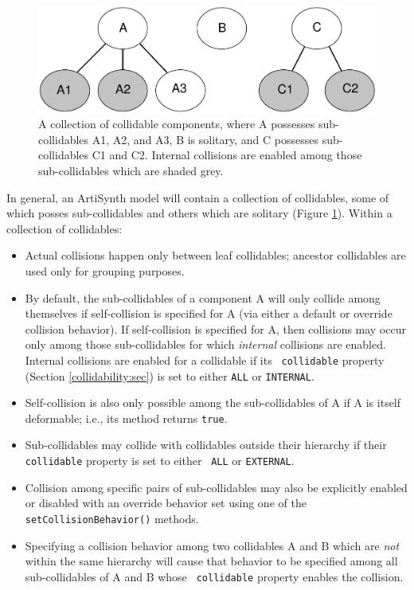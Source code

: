 \begin{figure}[ht]
\begin{center}
 \includegraphics[width=5in]{images/CollidableGroups}
\end{center}
\caption{A collection of collidable components, where A possesses
sub-collidables A1, A2, and A3, B is solitary, and C possesses
sub-collidables C1 and C2. Internal collisions are enabled among those
sub-collidables which are shaded grey.}
\label{CollidableGroups:fig}
\end{figure}

In general, an ArtiSynth model will contain a collection of
collidables, some of which posses sub-collidables and others which are
solitary (Figure \ref{CollidableGroups:fig}).  Within a collection of
collidables:

\begin{itemize}

\item Actual collisions happen only between leaf collidables; ancestor
collidables are used only for grouping purposes.

\item By default, the sub-collidables of a component A will only
collide among themselves if self-collision is specified for A (via
either a default or override collision behavior). If self-collision is
specified for A, then collisions may occur only among those
sub-collidables for which {\it internal} collisions are enabled.
Internal collisions are enabled for a collidable if its {\tt
collidable} property (Section \ref{collidability:sec}) is set to
either {\tt ALL} or {\tt INTERNAL}.

\item Self-collision is also only possible among the sub-collidables
of A if A is itself deformable; i.e., its
method returns {\tt true}.

\item Sub-collidables may collide with collidables outside their
hierarchy if their {\tt collidable} property is set to either {\tt
ALL} or {\tt EXTERNAL}.

\item Collision among specific pairs of sub-collidables may also be
explicitly enabled or disabled with an override behavior set using one
of the {\tt setCollisionBehavior()} methods.

\item Specifying a collision behavior among two collidables A and B
which are {\it not} within the same hierarchy will cause that behavior
to be specified among all sub-collidables of A and B whose {\tt
collidable} property enables the collision.

\end{itemize}

